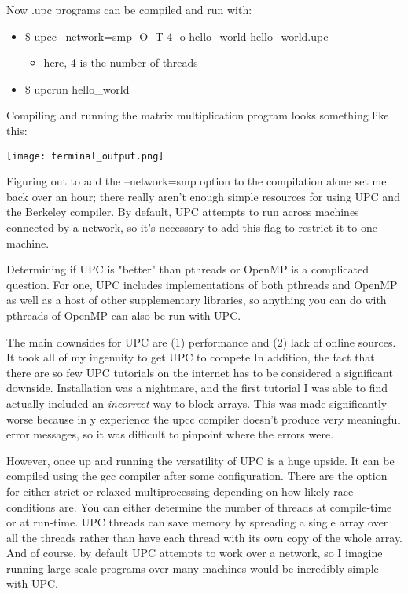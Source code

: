 \documentclass{article}
\begin{document}
\noindent
Now .upc programs can be compiled and run with:
\begin{itemize}
    \item \$ upcc --network=smp -O -T 4 -o hello\_world hello\_world.upc
    \begin{itemize}
        \item here, 4 is the number of threads
    \end{itemize}
    \item \$ upcrun hello\_world
\end{itemize}

\noindent
Compiling and running the matrix multiplication program looks something like this:

\begin{center}
    \texttt{[image: terminal\_output.png]}
\end{center}

Figuring out to add the --network=smp option to the compilation alone set me back over an hour; there really aren't enough simple resources for using UPC and the Berkeley compiler. By default, UPC attempts to run across machines connected by a network, so it's necessary to add this flag to restrict it to one machine.

\medskip
Determining if UPC is "better" than pthreads or OpenMP is a complicated question. For one, UPC includes implementations of both pthreads and OpenMP as well as a host of other supplementary libraries, so anything you can do with pthreads of OpenMP can also be run with UPC.

The main downsides for UPC are (1) performance and (2) lack of online sources. It took all of my ingenuity to get UPC to compete  In addition, the fact that there are so few UPC tutorials on the internet has to be considered a significant downside. Installation was a nightmare, and the first tutorial I was able to find actually included an \emph{incorrect} way to block arrays. This was made significantly worse because in y experience the upcc compiler doesn't produce very meaningful error messages, so it was difficult to pinpoint where the errors were.

However, once up and running the versatility of UPC is a huge upside. It can be compiled using the gcc compiler after some configuration. There are the option for either strict or relaxed multiprocessing depending on how likely race conditions are. You can either determine the number of threads at compile-time or at run-time. UPC threads can save memory by spreading a single array over all the threads rather than have each thread with its own copy of the whole array. And of course, by default UPC attempts to work over a network, so I imagine running large-scale programs over many machines would be incredibly simple with UPC.
\end{document}
